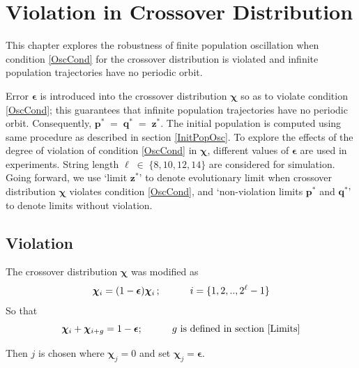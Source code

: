 \chapter{Violation in Crossover Distribution} \label{ch:chiviolation}
This chapter explores the robustness of finite population oscillation when condition \ref{OscCond} 
for the crossover distribution is violated and infinite population trajectories
have no periodic orbit.

Error $\bm{\epsilon}$ is introduced into the crossover distribution $\bm{\chi}$ so as to 
violate condition \ref{OscCond}; this guarantees that 
infinite population trajectories have no periodic orbit. Consequently, $\bm{p}^\ast \;=\; \bm{q}^\ast \;=\; \bm{z}^\ast$. 
The initial population is 
computed using same procedure as described in section \ref{InitPopOsc}. To explore the effects of the degree  
of violation of condition \ref{OscCond} in $\bm{\chi}$, different values of $\bm{\epsilon}$ are used in experiments. 
String length $\ell \;\in\; \{8, 10, 12, 14\}$ are considered for simulation.
Going forward, we use `limit $\bm{z}^\ast$' to denote evolutionary limit when crossover distribution 
$\bm{\chi}$ violates condition \ref{OscCond}, and 
`non-violation limits $\bm{p}^\ast$ and $\bm{q}^\ast$' to denote limits without violation.

\section{Violation}
The crossover distribution $\bm{\chi}$ was modified as
\[
\bm{\chi}_i = (1-\bm{\epsilon}) \bm{\chi}_i\, ; \hspace{30pt} i = \{1, 2,.., 2^{\ell}-1\} 
\]
So that 
\[
\bm{\chi}_i + \bm{\chi}_{i+g} = 1-\bm{\epsilon} ; \hspace{30pt} g \text{ is defined in  section } \ref{Limits}
\]

Then $j$ is chosen where $\bm{\chi}_j = 0$ and set $\bm{\chi}_j = \bm{\epsilon}$. 

